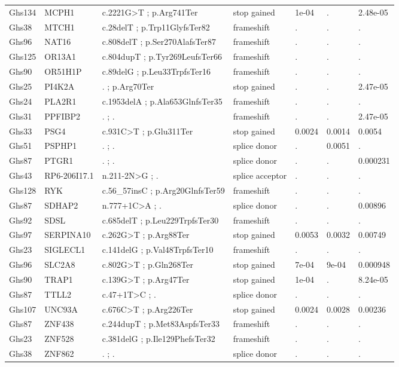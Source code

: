\documentclass[12pt,twoside]{reedthesis}
\theoremstyle{definition}
\theoremstyle{definition}
\theoremstyle{remark}
\begin{document}
\begin{landscape}
\begin{longtable}[t]{lllllll}
  Ghs134 & MCPH1 & c.2221G>T ; p.Arg741Ter & stop gained & 1e-04 & . & 2.48e-05\\
  Ghs38 & MTCH1 & c.28delT ; p.Trp11GlyfsTer82 & frameshift & . & . & .\\
  Ghs96 & NAT16 & c.808delT ; p.Ser270AlafsTer87 & frameshift & . & . & .\\
  Ghs125 & OR13A1 & c.804dupT ; p.Tyr269LeufsTer66 & frameshift & . & . & .\\
  \addlinespace
  Ghs90 & OR51H1P & c.89delG ; p.Leu33TrpfsTer16 & frameshift & . & . & .\\
  Ghs25 & PI4K2A & . ; p.Arg70Ter & stop gained & . & . & 2.47e-05\\
  Ghs24 & PLA2R1 & c.1953delA ; p.Ala653GlnfsTer35 & frameshift & . & . & .\\
  Ghs31 & PPFIBP2 & . ; . & frameshift & . & . & 2.47e-05\\
  Ghs33 & PSG4 & c.931C>T ; p.Glu311Ter & stop gained & 0.0024 & 0.0014 & 0.0054\\
  \addlinespace
  Ghs51 & PSPHP1 & . ; . & splice donor & . & 0.0051 & .\\
  Ghs87 & PTGR1 & . ; . & splice donor & . & . & 0.000231\\
  Ghs43 & RP6-206I17.1 & n.211-2N>G ; . & splice acceptor & . & . & .\\
  Ghs128 & RYK & c.56\_57insC ; p.Arg20GlnfsTer59 & frameshift & . & . & .\\
  Ghs87 & SDHAP2 & n.777+1C>A ; . & splice donor & . & . & 0.00896\\
  \addlinespace
  Ghs92 & SDSL & c.685delT ; p.Leu229TrpfsTer30 & frameshift & . & . & .\\
  Ghs97 & SERPINA10 & c.262G>T ; p.Arg88Ter & stop gained & 0.0053 & 0.0032 & 0.00749\\
  Ghs23 & SIGLECL1 & c.141delG ; p.Val48TrpfsTer10 & frameshift & . & . & .\\
  Ghs96 & SLC2A8 & c.802G>T ; p.Gln268Ter & stop gained & 7e-04 & 9e-04 & 0.000948\\
  Ghs90 & TRAP1 & c.139G>T ; p.Arg47Ter & stop gained & 1e-04 & . & 8.24e-05\\
  \addlinespace
  Ghs87 & TTLL2 & c.47+1T>C ; . & splice donor & . & . & .\\
  Ghs107 & UNC93A & c.676C>T ; p.Arg226Ter & stop gained & 0.0024 & 0.0028 & 0.00236\\
  Ghs87 & ZNF438 & c.244dupT ; p.Met83AspfsTer33 & frameshift & . & . & .\\
  Ghs23 & ZNF528 & c.381delG ; p.Ile129PhefsTer32 & frameshift & . & . & .\\
  Ghs38 & ZNF862 & . ; . & splice donor & . & . & .\\
  \bottomrule
  \end{longtable}
  \end{landscape}
  
\end{document}
